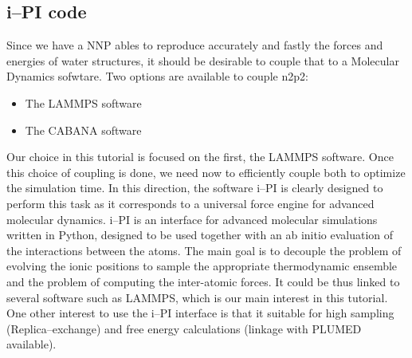 \documentclass[12pt]{article}
\begin{document}
\subsection{i--PI code}
Since we have a NNP ables to reproduce accurately and fastly the forces and energies of water structures, it should be desirable to couple that to a Molecular Dynamics sofwtare. Two options are available to couple n2p2:
\begin{itemize}
    \item The LAMMPS software
    \item The CABANA software
\end{itemize}
Our choice in this tutorial is focused on the first, the LAMMPS software. Once this choice of coupling is done, we need now to efficiently couple both to optimize the simulation time. In this direction, the software i--PI is clearly designed to perform this task as it corresponds to a universal force engine for advanced molecular dynamics. i--PI is an interface for advanced molecular simulations written in Python, designed to be used together with an ab initio evaluation of the interactions between the atoms. The main goal is to decouple the problem of evolving the ionic positions to sample the appropriate thermodynamic ensemble and the problem of computing the inter-atomic forces. It could be thus linked to several software such as LAMMPS, which is our main interest in this tutorial. One other interest to use the i--PI interface is that it suitable for high sampling (Replica--exchange) and free energy calculations (linkage with PLUMED available).
%
\end{document}
